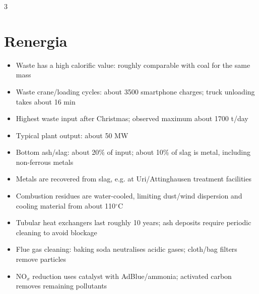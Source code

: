 \documentclass[9pt, landscape, a4paper]{article}
\newcommand{\cel}{\ensuremath{^\circ}C}
\begin{document}
\begin{multicols*}{3}
\part{Renergia}
\begin{itemize}
  \item Waste has a high calorific value: roughly comparable with coal for the same mass
  \item Waste crane/loading cycles: about 3500 smartphone charges; truck unloading takes about 16 min
  \item Highest waste input after Christmas; observed maximum about 1700 t/day
  \item Typical plant output: about 50 MW
  \item Bottom ash/slag: about 20\% of input; about 10\% of slag is metal, including non-ferrous metals
  \item Metals are recovered from slag, e.g. at Uri/Attinghausen treatment facilities
  \item Combustion residues are water-cooled, limiting dust/wind dispersion and cooling material from about 110\cel
  \item Tubular heat exchangers last roughly 10 years; ash deposits require periodic cleaning to avoid blockage
  \item Flue gas cleaning: baking soda neutralises acidic gases; cloth/bag filters remove particles
  \item NO$_x$ reduction uses catalyst with AdBlue/ammonia; activated carbon removes remaining pollutants
\end{itemize}






































\end{multicols*}
\end{document}
